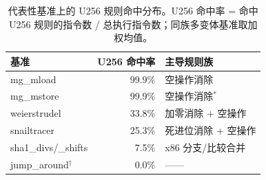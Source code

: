\begin{table}[t]
\centering
\caption{代表性基准上的 U256 规则命中分布。U256 命中率 = 命中 U256 规则的指令数 / 总执行指令数；同族多变体基准取加权均值。}
\label{tab:family-attribution}
\footnotesize
\begin{tabular}{@{}lrl@{}}
\toprule
基准 & U256 命中率 & 主导规则族 \\
\midrule
mg\_mload              & 99.9\% & 空操作消除 \\
mg\_mstore             & 99.9\% & 空操作消除$^*$ \\
weierstrudel           & 33.8\% & 加零消除 + 空操作 \\
snailtracer            & 25.3\% & 死进位消除 + 空操作 \\
sha1\_divs/\_shifts    &  7.5\% & x86 分支/比较合并 \\
jump\_around$^\dagger$ &  0.0\% & —— \\
\bottomrule
\end{tabular}
\vspace{2pt}
\par{}
\end{table}
